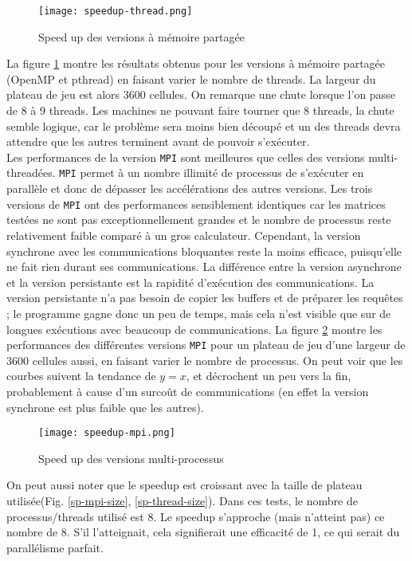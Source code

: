 \begin{figure}[!ht]
\centering
\texttt{[image: speedup-thread.png]}
\caption{Speed up des versions à mémoire partagée}
\label{fig:sp-thread}
\end{figure}

La figure \ref{fig:sp-thread} montre les résultats obtenus pour les versions à mémoire partagée (OpenMP et pthread) en faisant varier le nombre de threads. La largeur du plateau de jeu est alors 3600 cellules.
On remarque une chute lorsque l'on passe de 8 à 9 threads. Les machines ne pouvant faire tourner que 8 threads, la chute semble logique, car le problème sera moins bien découpé et un des threads devra attendre que les autres terminent avant de pouvoir s'exécuter.\\

Les performances de la version \texttt{MPI} sont meilleures que celles des versions multi-threadées. \texttt{MPI} permet à un nombre illimité de processus de s'exécuter en parallèle et donc de dépasser les accélérations des autres versions. Les trois versions de \texttt{MPI} ont des performances sensiblement identiques car les matrices testées ne sont pas exceptionnellement grandes et le nombre de processus reste relativement faible comparé à un gros calculateur. Cependant, la version synchrone avec les communications bloquantes reste la moins efficace, puisqu'elle ne fait rien durant ses communications. La différence entre la version asynchrone et la version persistante est la rapidité d'exécution des communications. La version persistante n'a pas besoin de copier les buffers et de préparer les requêtes ; le programme gagne donc un peu de temps, mais cela n'est visible que sur de longues exécutions avec beaucoup de communications.
La figure \ref{fig:sp-proc} montre les performances des différentes versions \texttt{MPI} pour un plateau de jeu d'une largeur de 3600 cellules aussi, en faisant varier le nombre de processus. On peut voir que les courbes suivent la tendance de $y=x$, et décrochent un peu vers la fin, probablement à cause d'un surcoût de communications (en effet la version synchrone est plus faible que les autres).

\begin{figure}[H]
\centering
\texttt{[image: speedup-mpi.png]}
\caption{Speed up des versions multi-processus}
\label{fig:sp-proc}
\end{figure}

On peut aussi noter que le speedup est croissant avec la taille de plateau utilisée(Fig. \ref{sp-mpi-size}, \ref{sp-thread-size}). Dans ces tests, le nombre de processus/threads utilisé est 8. Le speedup s'approche (mais n'atteint pas) ce nombre de 8. S'il l'atteignait, cela signifierait une efficacité de 1, ce qui serait du parallélisme parfait.

